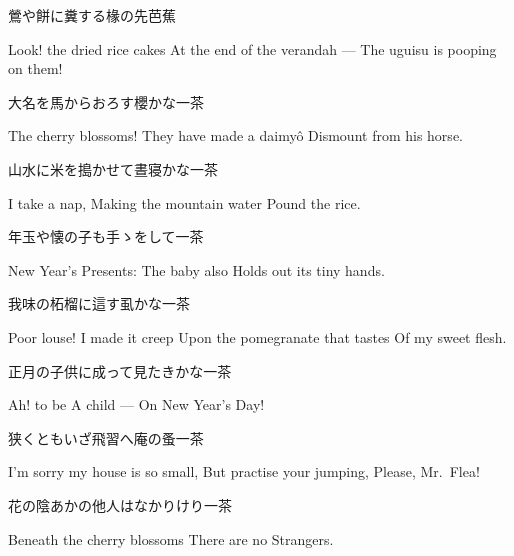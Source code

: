 \begin{haiku}
    {\FH 鶯や餅に糞する椽の先}\hfill{\FH 芭蕉}

    \vin{} Look! the dried rice cakes
    \vin{} \vin{} At the end of the verandah ---
    \vin{} \vin{} \vin{} The uguisu is pooping on them!
\end{haiku}

\begin{haiku}
    {\FH 大名を馬からおろす櫻かな}\hfill{\FH 一茶}

    \vin{} The cherry blossoms!
    \vin{} \vin{} They have made a daimy\^o
    \vin{} \vin{} \vin{} Dismount from his horse.
\end{haiku}

\begin{haiku}
    {\FH 山水に米を搗かせて晝寝かな}\hfill{\FH 一茶}

    \vin{} I take a nap,
    \vin{} \vin{} Making the mountain water
    \vin{} \vin{} \vin{} Pound the rice.
\end{haiku}

\begin{haiku}
    {\FH 年玉や懐の子も手ゝをして}\hfill{\FH 一茶}

    \vin{} New Year's Presents:
    \vin{} \vin{} The baby also
    \vin{} \vin{} \vin{} Holds out its tiny hands.
\end{haiku}

\begin{haiku}
    {\FH 我味の柘榴に這す虱かな}\hfill{\FH 一茶}

    \vin{} Poor louse! I made it creep
    \vin{} \vin{} Upon the pomegranate that tastes
    \vin{} \vin{} \vin{} Of my sweet flesh.
\end{haiku}

\begin{haiku}
    {\FH 正月の子供に成って見たきかな}\hfill{\FH 一茶}

    \vin{} Ah! to be
    \vin{} \vin{} A child ---
    \vin{} \vin{} \vin{} On New Year's Day!
\end{haiku}

\begin{haiku}
    {\FH 狭くともいざ飛習へ庵の蚤}\hfill{\FH 一茶}

    \vin{} I'm sorry my house is so small,
    \vin{} \vin{} But practise your jumping,
    \vin{} \vin{} \vin{} Please, Mr.\ Flea!
\end{haiku}

\begin{haiku}
    {\FH 花の陰あかの他人はなかりけり}\hfill{\FH 一茶}

    \vin{} Beneath the cherry blossoms
    \vin{} \vin{} There are no
    \vin{} \vin{} \vin{} Strangers.
\end{haiku}

